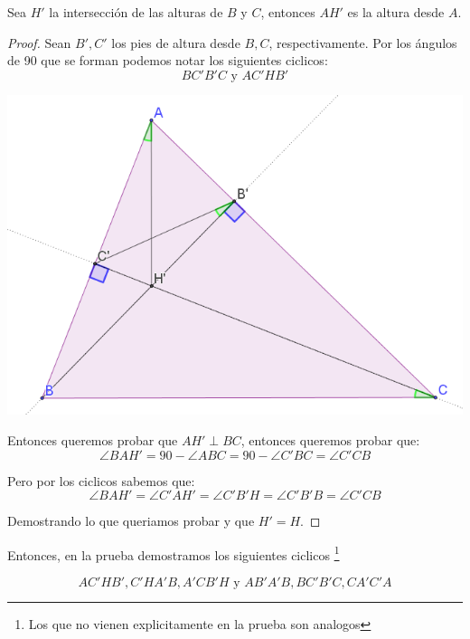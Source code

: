 \documentclass[11pt]{scrartcl}
\begin{document}
\begin{claim}
Sea $H'$ la intersecci\'on de las alturas de $B$ y $C$, entonces $AH'$ es la altura desde $A$.
\end{claim}

\begin{proof}
Sean $B',C'$ los pies de altura desde $B,C$, respectivamente. Por los \'angulos de 90 que se forman podemos notar los siguientes ciclicos: 
\[ BC'B'C \text{ y } AC'HB' \]

\begin{center}
    
\includegraphics[scale=0.8]{PNAC1.png}
\end{center}

Entonces queremos probar que $AH' \perp BC$, entonces queremos probar que:
\[\angle BAH' = 90-\angle ABC = 90-\angle C'BC=\angle C'CB\]

Pero por los ciclicos sabemos que:
\[\angle BAH'= \angle C'AH'=\angle C'B'H= \angle C'B'B =\angle C'CB\]

Demostrando lo que queriamos probar y que $H'=H$.

\end{proof}

Entonces, en la prueba demostramos los siguientes ciclicos \footnote{Los que no vienen explicitamente en la prueba son analogos}

\[AC'HB', C'HA'B, A'CB'H \text{ y } AB'A'B, BC'B'C, CA'C'A \]
\end{document}
